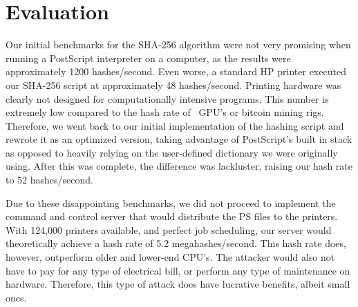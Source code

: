 \section{Evaluation}

Our initial benchmarks for the SHA-256 algorithm were not very promising when running a PostScript interpreter on a computer, as the results were approximately 1200 hashes/second.
Even worse, a standard HP printer executed our SHA-256 script at approximately 48 hashes/second.
Printing hardware was clearly not designed for computationally intensive programs.
This number is extremely low compared to the hash rate of  GPU’s or bitcoin mining rigs.
Therefore, we went back to our initial implementation of the hashing script and rewrote it as an optimized version, taking advantage of PostScript’s built in stack as opposed to heavily relying on the user-defined dictionary we were originally using.
After this was complete, the difference was lackluster, raising our hash rate to 52 hashes/second.

Due to these disappointing benchmarks, we did not proceed to implement the command and control server that would distribute the PS files to the printers.
With 124,000 printers available, and perfect job scheduling, our server would theoretically achieve a hash rate of 5.2 megahashes/second.
This hash rate does, however, outperform older and lower-end CPU’s.
The attacker would also not have to pay for any type of electrical bill, or perform any type of maintenance on hardware.
Therefore, this type of attack does have lucrative benefits, albeit small ones.

\begin{table}
\label{bitcoin_hardware}
\end{table}
